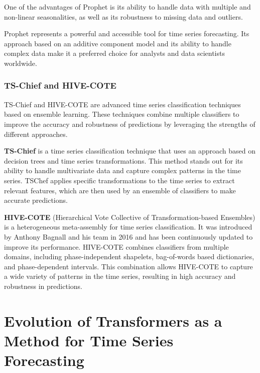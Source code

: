 One of the advantages of Prophet is its ability to handle data with multiple and non-linear seasonalities, as well as its robustness to missing data and outliers.

Prophet represents a powerful and accessible tool for time series forecasting. Its approach based on an additive component model and its ability to handle complex data make it a preferred choice for analysts and data scientists worldwide.
\vspace{10pt}

\subsubsection{TS-Chief and HIVE-COTE}
TS-Chief\cite{Shifaz_2020} and HIVE-COTE\cite{7837946} are advanced time series classification techniques based on ensemble learning. These techniques combine multiple classifiers to improve the accuracy and robustness of predictions by leveraging the strengths of different approaches.
\vspace{10pt}

\textbf{TS-Chief} is a time series classification technique that uses an approach based on decision trees and time series transformations. This method stands out for its ability to handle multivariate data and capture complex patterns in the time series. TSChef applies specific transformations to the time series to extract relevant features, which are then used by an ensemble of classifiers to make accurate predictions.
\vspace{10pt}

\textbf{HIVE-COTE} (Hierarchical Vote Collective of Transformation-based Ensembles) is a heterogeneous meta-assembly for time series classification. It was introduced by Anthony Bagnall and his team in 2016 and has been continuously updated to improve its performance. HIVE-COTE combines classifiers from multiple domains, including phase-independent shapelets, bag-of-words based dictionaries, and phase-dependent intervals. This combination allows HIVE-COTE to capture a wide variety of patterns in the time series, resulting in high accuracy and robustness in predictions.




\section{Evolution of Transformers as a Method for Time Series Forecasting}

